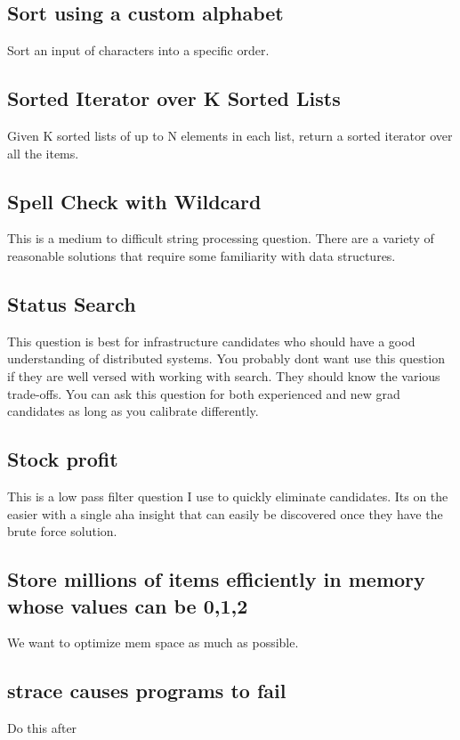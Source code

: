\documentclass{llncs}
\begin{document}
\subsection{Sort using a custom alphabet}
Sort an input of characters into a specific order.

\subsection{Sorted Iterator over K Sorted Lists}
Given K sorted lists of up to N elements in each list, return a sorted iterator over all the items.

\subsection{Spell Check with Wildcard}
This is a medium to difficult string processing question. There are a variety of reasonable solutions that require some familiarity with data structures.

\subsection{Status Search}
This question is best for infrastructure candidates who should have a good understanding of distributed systems. You probably dont want use this question if they are well versed with working with search. They should know the various trade-offs. You can ask this question for both experienced and new grad candidates as long as you calibrate differently.

\subsection{Stock profit}
This is a low pass filter question I use to quickly eliminate candidates. Its on the easier with a single aha insight that can easily be discovered once they have the brute force solution.

\subsection{Store millions of items efficiently in memory whose values can be 0,1,2}
We want to optimize mem space as much as possible.

\subsection{strace causes programs to fail}
Do this after
\end{document}
